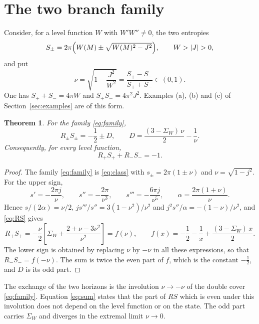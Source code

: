 \documentclass[11pt]{article}
\newtheorem{theorem}{Theorem}
\theoremstyle{definition}
\theoremstyle{remark}
\newcommand{\SW}{\Sigma_{W}}
\begin{document}
\section{The two branch family}\label{sec:mirror}

Consider, for a level function $W$ with $W'W''\neq0$, the two entropies
\begin{equation}\label{eq:family}
S_{\pm}=2\pi\Bigl(W(M)\pm\sqrt{W(M)^{2}-J^{2}}\Bigr),\qquad W>|J|>0 ,
\end{equation}
and put
\begin{equation}\label{eq:nu}
\nu=\sqrt{1-\frac{J^{2}}{W^{2}}}=\frac{S_{+}-S_{-}}{S_{+}+S_{-}}\in(0,1) .
\end{equation}
One has $S_{+}+S_{-}=4\pi W$ and $S_{+}S_{-}=4\pi^{2}J^{2}$. Examples (a), (b) and (c) of Section~\ref{sec:examples} are of this form.

\begin{theorem}\label{thm:mirror}
For the family \eqref{eq:family},
\begin{equation}\label{eq:split}
R_{\pm}S_{\pm}=-\frac12\pm D,\qquad D=\frac{(3-\SW)\,\nu}{2}-\frac1\nu .
\end{equation}
Consequently, for every level function,
\begin{equation}\label{eq:sum}
R_{+}S_{+}+R_{-}S_{-}=-1 .
\end{equation}
\end{theorem}

\begin{proof}
The family \eqref{eq:family} is \eqref{eq:class} with $s_{\pm}=2\pi(1\pm\nu)$ and $\nu=\sqrt{1-j^{2}}$. For the upper sign,
\[
s'=-\frac{2\pi j}{\nu},\qquad s''=-\frac{2\pi}{\nu^{3}},\qquad s'''=-\frac{6\pi j}{\nu^{5}},\qquad \alpha=\frac{2\pi(1+\nu)}{\nu} .
\]
Hence $s/(2\alpha)=\nu/2$, $js'''/s''=3(1-\nu^{2})/\nu^{2}$ and $j^{2}s''/\alpha=-(1-\nu)/\nu^{2}$, and \eqref{eq:RS} gives
\begin{equation}\label{eq:f}
R_{+}S_{+}=-\frac\nu2\left[\SW+\frac{2+\nu-3\nu^{2}}{\nu^{2}}\right]=f(\nu),
\qquad
f(x)=-\frac12-\frac1x+\frac{(3-\SW)\,x}{2} .
\end{equation}
The lower sign is obtained by replacing $\nu$ by $-\nu$ in all these expressions, so that $R_{-}S_{-}=f(-\nu)$. The sum is twice the even part of $f$, which is the constant $-\tfrac12$, and $D$ is its odd part.
\end{proof}

The exchange of the two horizons is the involution $\nu\to-\nu$ of the double cover \eqref{eq:family}. Equation \eqref{eq:sum} states that the part of $RS$ which is even under this involution does not depend on the level function or on the state. The odd part carries $\SW$ and diverges in the extremal limit $\nu\to0$.
\end{document}
